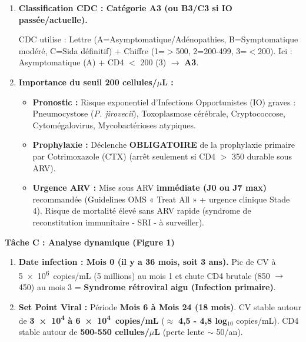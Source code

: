 \documentclass[11pt]{article}
\begin{document}
\begin{exoresolu}
\begin{enumerate}
    Justification : CD4 = \SI{180}{cellules/\micro\liter} ($<$ \SI{200}{cellules/\micro\liter}) \textbf{ET} Pourcentage CD4 = 12\% ($<$ 14\%). Le seuil des 200 cellules/$\mu$L (ou 14\%) définit le Stade 4 (Sida) immunologique, \textbf{même en l'absence de signes cliniques} (Stade clinique 1 = Asymptomatique). Le patient est donc \textbf{Stade Clinique 1 / Stade Immunologique 4}.
    
    \item \textbf{Classification CDC : Catégorie A3 (ou B3/C3 si IO passée/actuelle).}
    
    CDC utilise : Lettre (A=Asymptomatique/Adénopathies, B=Symptomatique modéré, C=Sida définitif) + Chiffre (1=$>$500, 2=200-499, 3=$<$200).
    Ici : Asymptomatique (A) + CD4 $<$ 200 (3) $\rightarrow$ \textbf{A3}.
    
    \item \textbf{Importance du seuil 200 cellules/$\mu$L :}
    \begin{itemize}
        \item \textbf{Pronostic :} Risque exponentiel d'Infections Opportunistes (IO) graves : Pneumocystose (\emph{P. jirovecii}), Toxoplasmose cérébrale, Cryptococcose, Cytomégalovirus, Mycobactérioses atypiques.
        \item \textbf{Prophylaxie :} Déclenche \textbf{OBLIGATOIRE} de la prophylaxie primaire par Cotrimoxazole (CTX) (arrêt seulement si CD4 $>$ 350 durable sous ARV).
        \item \textbf{Urgence ARV :} Mise sous ARV \textbf{immédiate (J0 ou J7 max)} recommandée (Guidelines OMS « Treat All » + urgence clinique Stade 4). Risque de mortalité élevé sans ARV rapide (syndrome de reconstitution immunitaire - SRI - à surveiller).
    \end{itemize}
\end{enumerate}

\noindent\textbf{Tâche C : Analyse dynamique (Figure 1)}
\begin{enumerate}
    \item \textbf{Date infection : Mois 0 (il y a 36 mois, soit 3 ans).} Pic de CV à \SI{5e6}{copies/mL} (5 millions) au mois 1 et chute CD4 brutale (850 $\rightarrow$ 450) au mois 3 = \textbf{Syndrome rétroviral aigu (Infection primaire)}.
    \item \textbf{Set Point Viral :} Période \textbf{Mois 6 à Mois 24 (18 mois)}. CV stable autour de \textbf{\num{3e4} à \SI{6e4}{copies/mL}} ($\approx$ \textbf{4,5 - 4,8 log$_{10}$} copies/mL). CD4 stable autour de \textbf{500-550 cellules/$\mu$L} (perte lente $\sim$ 50/an).
    

\end{enumerate}
\end{exoresolu}
\end{document}
